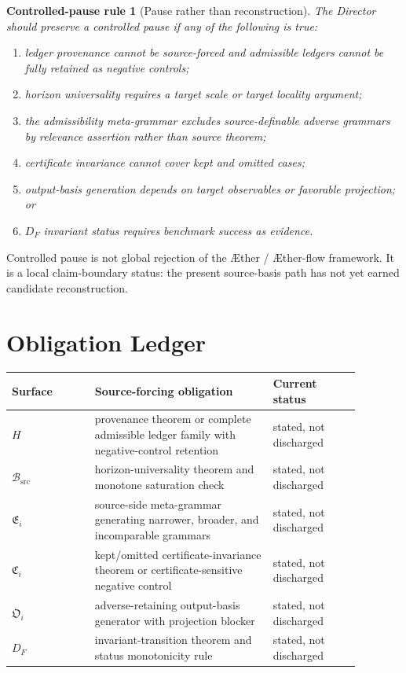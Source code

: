 \documentclass[11pt]{article}
\newcommand{\Aether}{\AE{}ther}
\newcommand{\Aflow}{\AE{}ther-flow}
\newcommand{\TheoryProgram}{\Aether{} / \Aflow{} framework}
\newcommand{\EnumFam}{\mathfrak{E}}
\newcommand{\CertFam}{\mathfrak{C}}
\newcommand{\OutFam}{\mathfrak{O}}
\newtheorem{pauserule}{Controlled-pause rule}
\begin{document}
\begin{pauserule}[Pause rather than reconstruction]
The Director should preserve a controlled pause if any of the following is
true:
\begin{enumerate}
    \item ledger provenance cannot be source-forced and admissible ledgers
    cannot be fully retained as negative controls;
    \item horizon universality requires a target scale or target locality
    argument;
    \item the admissibility meta-grammar excludes source-definable adverse
    grammars by relevance assertion rather than source theorem;
    \item certificate invariance cannot cover kept and omitted cases;
    \item output-basis generation depends on target observables or favorable
    projection; or
    \item \(D_F\) invariant status requires benchmark success as evidence.
\end{enumerate}
\end{pauserule}

Controlled pause is not global rejection of the \TheoryProgram{}. It is a
local claim-boundary status: the present source-basis path has not yet earned
candidate reconstruction.

\section{Obligation Ledger}

\begin{center}
\begin{tabular}{p{0.21\linewidth}p{0.45\linewidth}p{0.22\linewidth}}
\textbf{Surface} & \textbf{Source-forcing obligation} & \textbf{Current status} \\
\hline
\(H\) & provenance theorem or complete admissible ledger family with negative-control retention & stated, not discharged \\
\(\mathcal{B}_{\mathrm{src}}\) & horizon-universality theorem and monotone saturation check & stated, not discharged \\
\(\EnumFam_i\) & source-side meta-grammar generating narrower, broader, and incomparable grammars & stated, not discharged \\
\(\CertFam_i\) & kept/omitted certificate-invariance theorem or certificate-sensitive negative control & stated, not discharged \\
\(\OutFam_i\) & adverse-retaining output-basis generator with projection blocker & stated, not discharged \\
\(D_F\) & invariant-transition theorem and status monotonicity rule & stated, not discharged \\
\end{tabular}
\end{center}
\end{document}
